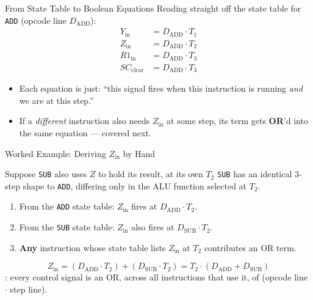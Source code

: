\documentclass[aspectratio=169]{beamer}
\begin{document}
\begin{frame}{From State Table to Boolean Equations}
  Reading straight off the state table for \texttt{ADD} (opcode line $D_{\text{ADD}}$):
  \begin{align*}
    Y_{\text{in}} &= D_{\text{ADD}} \cdot T_1 \\
    Z_{\text{in}} &= D_{\text{ADD}} \cdot T_2 \\
    R1_{\text{in}} &= D_{\text{ADD}} \cdot T_3 \\
    SC_{\text{clear}} &= D_{\text{ADD}} \cdot T_3
  \end{align*}
  \begin{itemize}
    \item Each equation is just: ``this signal fires when this instruction is
      running \emph{and} we are at this step.''
    \item If a \emph{different} instruction also needs $Z_{\text{in}}$ at some step, its
      term gets \textbf{OR}'d into the same equation --- covered next.
  \end{itemize}
\end{frame}

\begin{frame}{Worked Example: Deriving $Z_{\text{in}}$ by Hand}
  \begin{block}{Suppose \texttt{SUB} also uses $Z$ to hold its result, at its own $T_2$}
    \texttt{SUB} has an identical 3-step shape to \texttt{ADD}, differing only in
    the ALU function selected at $T_2$.
  \end{block}
  \begin{enumerate}
    \item From the \texttt{ADD} state table: $Z_{\text{in}}$ fires at $D_{\text{ADD}} \cdot T_2$.
    \item From the \texttt{SUB} state table: $Z_{\text{in}}$ also fires at $D_{\text{SUB}} \cdot T_2$.
    \item \textbf{Any} instruction whose state table lists $Z_{\text{in}}$ at $T_2$
      contributes an OR term.
  \end{enumerate}
  \[
    Z_{\text{in}} = (D_{\text{ADD}} \cdot T_2) + (D_{\text{SUB}} \cdot T_2) = T_2 \cdot (D_{\text{ADD}} + D_{\text{SUB}})
  \]
  : every control signal is an OR, across all
  instructions that use it, of (opcode line $\cdot$ step line).
\end{frame}
\end{document}
